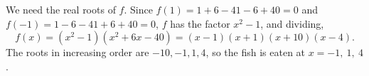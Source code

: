 We need the real roots of $f$. Since $f(1)=1+6-41-6+40=0$ and $f(-1)=1-6-41+6+40=0$, $f$ has the factor $x^2-1$, and dividing,
\[f(x)=\left(x^2-1\right)\left(x^2+6x-40\right)=(x-1)(x+1)(x+10)(x-4).\]
The roots in increasing order are $-10,-1,1,4$, so the fish is eaten at $x=\boxed{-1},\ \boxed{1},\ \boxed{4}$.
